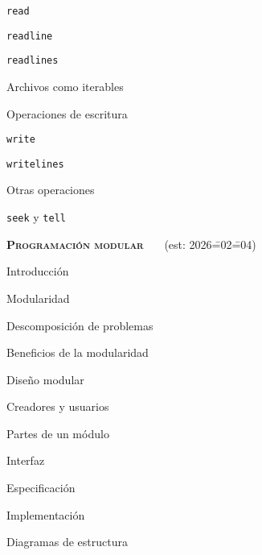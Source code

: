 \begin{longenum}
\begin{longenum}
        \begin{longenum}
            \item \texttt{read}
            \item \texttt{readline}
            \item \texttt{readlines}
            \item Archivos como iterables
        \end{longenum}
        \item Operaciones de escritura
        \begin{longenum}
            \item \texttt{write}
            \item \texttt{writelines}
        \end{longenum}
        \item Otras operaciones
        \begin{longenum}
            \item \texttt{seek} y \texttt{tell}
        \end{longenum}
    \end{longenum}
    \item \textbf{\textsc{Programación modular}} \ \ \ (est: 2026\==02\==04)
    \begin{longenum}
        \item Introducción
        \begin{longenum}
            \item Modularidad
            \item Descomposición de problemas
            \item Beneficios de la modularidad
        \end{longenum}
        \item Diseño modular
        \begin{longenum}
            \item Creadores y usuarios
            \item Partes de un módulo
            \begin{longenum}
                \item Interfaz
                \begin{longenum}
                    \item Especificación
                \end{longenum}
                \item Implementación
            \end{longenum}
            \item Diagramas de estructura

\end{longenum}
\end{longenum}
\end{longenum}
